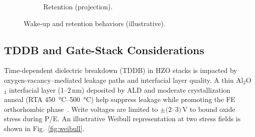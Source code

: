 \documentclass[journal]{IEEEtran}
\begin{document}
\begin{figure}[t]
\begin{subfigure}[b]{0.48\linewidth}
\caption{Retention (projection).}
\end{subfigure}
\caption{Wake-up and retention behaviors (illustrative).}
\label{fig:retention_wakeup}
\end{figure}

\subsection*{TDDB and Gate-Stack Considerations}
Time-dependent dielectric breakdown (TDDB) in HZO stacks is impacted by oxygen-vacancy–mediated leakage paths and interfacial layer quality. A thin Al$_2$O$_3$ interfacial layer (1--2\,nm) deposited by ALD and moderate crystallization anneal (RTA \SI{450}{\celsius}--\SI{500}{\celsius}) help suppress leakage while promoting the FE orthorhombic phase~\cite{Mueller2015,Park2020}. Write voltages are limited to $\pm(2$--$3)$\,V to bound oxide stress during P/E. An illustrative Weibull representation at two stress fields is shown in Fig.~\ref{fig:weibull}.
\end{document}
